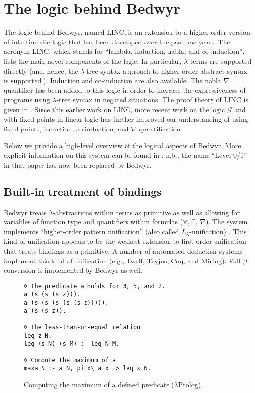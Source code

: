 \documentclass{article}
\newcommand{\lp}{$\lambda$Prolog}
\newcommand{\Ll}{$L_\lambda$}
\begin{document}
\section{The logic behind Bedwyr}
\label{logic}

The logic behind Bedwyr, named LINC, is an extension to a higher-order
version of intuitionistic logic that has been developed over the past
few years.  The acronym LINC, which stands for ``lambda, induction,
nabla, and co-induction'', lists the main novel components of the
logic.  In particular, $\lambda$-terms are supported directly (and,
hence, the $\lambda$-tree syntax approach to higher-order abstract
syntax is supported \cite{miller00cl}).  Induction and co-induction
are also available.  The nabla $\nabla$ quantifier has been added to
this logic in order to increase the expressiveness of programs using
$\lambda$-tree syntax in negated situations.  The proof theory of LINC
is given in \cite{miller05tocl,tiu04phd}.  Since this earlier work on
LINC, more recent work on the logic $\mathcal{G}$
\cite{gacek.twolevel,gacek11ic} and with fixed points in linear logic
\cite{baelde08phd,baelde12tocl} has further improved our understanding
of using fixed points, induction, co-induction, and
$\nabla$-quantification.

Below we provide a high-level overview of the logical aspects of Bedwyr.
More explicit information on this system can be found in
\cite{tiu05eshol}: n.b., the name ``Level 0/1'' in that paper has now
been replaced by Bedwyr.

\subsection{Built-in treatment of bindings}

Bedwyr treats $\lambda$-abstractions within terms as primitive as well
as allowing for variables of function type and quantifiers within
formulas ($\forall$, $\exists$, $\nabla$).  The system
implements ``higher-order pattern unification'' (also called
\Ll-unification) \cite{miller91jlc}.   This kind of unification
appears to be the weakest extension to first-order unification that
treats bindings as a primitive.  A number of automated deduction systems
implement this kind of unification (e.g., Twelf, Teyjus, Coq, and
Minlog).  Full $\beta$-conversion is implemented by Bedwyr as well.

\begin{figure}
\begin{verbatim}
% The predicate a holds for 3, 5, and 2.
a (s (s (s z))).
a (s (s (s (s (s z))))).
a (s (s z)).

% The less-than-or-equal relation
leq z N.
leq (s N) (s M) :- leq N M.

% Compute the maximum of a
maxa N :- a N, pi x\ a x => leq x N.
\end{verbatim}
\caption{Computing the maximum of a defined predicate (\lp).}
\label{maxa-lp}
\end{figure}
\end{document}
